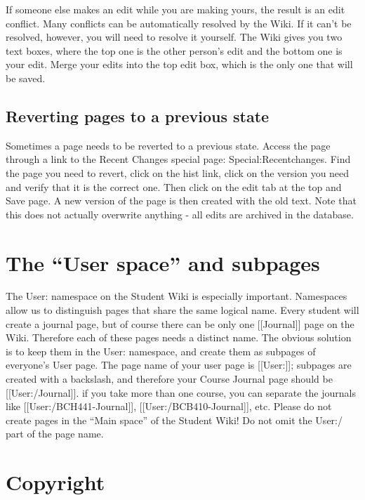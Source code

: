 \documentclass[]{book}
\begin{document}
If someone else makes an edit while you are making yours, the result is
an edit conflict. Many conflicts can be automatically resolved by the
Wiki. If it can't be resolved, however, you will need to resolve it
yourself. The Wiki gives you two text boxes, where the top one is the
other person's edit and the bottom one is your edit. Merge your edits
into the top edit box, which is the only one that will be saved.

\subsection{Reverting pages to a previous
state}\label{reverting-pages-to-a-previous-state}

Sometimes a page needs to be reverted to a previous state. Access the
page through a link to the Recent Changes special page:
Special:Recentchanges. Find the page you need to revert, click on the
hist link, click on the version you need and verify that it is the
correct one. Then click on the edit tab at the top and Save page. A new
version of the page is then created with the old text. Note that this
does not actually overwrite anything - all edits are archived in the
database.

\section{\texorpdfstring{The ``User space'' and
subpages}{The User space and subpages}}\label{the-user-space-and-subpages}

The User: namespace on the Student Wiki is especially important.
Namespaces allow us to distinguish pages that share the same logical
name. Every student will create a journal page, but of course there can
be only one {[}{[}Journal{]}{]} page on the Wiki. Therefore each of
these pages needs a distinct name. The obvious solution is to keep them
in the User: namespace, and create them as subpages of everyone's User
page. The page name of your user page is {[}{[}User:{]}{]}; subpages are
created with a backslash, and therefore your Course Journal page should
be {[}{[}User:/Journal{]}{]}. if you take more than one course, you can
separate the journals like {[}{[}User:/BCH441-Journal{]}{]},
{[}{[}User:/BCB410-Journal{]}{]}, etc. Please do not create pages in the
``Main space'' of the Student Wiki! Do not omit the User:/ part of the
page name.

\section{Copyright}\label{copyright}
\end{document}
